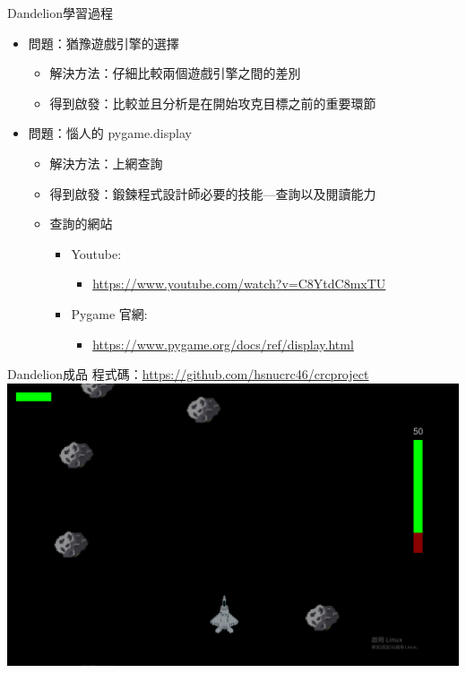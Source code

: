 \documentclass{article}
\begin{document}
\begin{large}
    \begin{boxpar}{Dandelion}{學習過程}
\begin{itemize}
    \item 問題：猶豫遊戲引擎的選擇
        \begin{itemize}
            \item 解決方法：仔細比較兩個遊戲引擎之間的差別
            \item 得到啟發：比較並且分析是在開始攻克目標之前的重要環節
        \end{itemize}
        \item 問題：惱人的 pygame.display
        \begin{itemize}
            \item 解決方法：上網查詢
            \item 得到啟發：鍛鍊程式設計師必要的技能—查詢以及閱讀能力
            \item 查詢的網站
                \begin{itemize}
                    \item Youtube:
                    \begin{itemize}
                        \item \url{https://www.youtube.com/watch?v=C8YtdC8mxTU}
                    \end{itemize}
                    \item Pygame 官網:
                        \begin{itemize}
                            \item \url{https://www.pygame.org/docs/ref/display.html}
                        \end{itemize}
                \end{itemize}
        \end{itemize}
\end{itemize}
    \end{boxpar}
\newpage
\begin{boxpar}{Dandelion}{成品}
    程式碼：\url{https://github.com/hsnucrc46/crcproject}\\
    \includegraphics[width=\linewidth]{src/game.png}
\end{boxpar}
\end{large}
\end{document}
